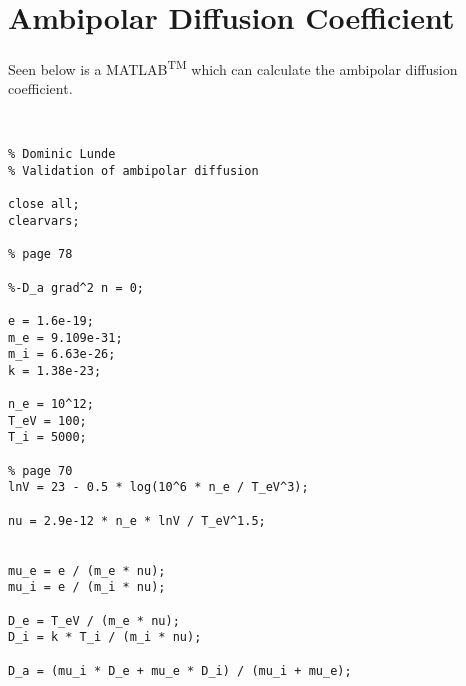 \chapter{Ambipolar Diffusion Coefficient}
\label{app:adc}
Seen below is a MATLAB\textsuperscript{TM} which can calculate the ambipolar diffusion coefficient. 

\begin{verbatim}


% Dominic Lunde
% Validation of ambipolar diffusion

close all;
clearvars;

% page 78

%-D_a grad^2 n = 0;

e = 1.6e-19;
m_e = 9.109e-31;
m_i = 6.63e-26;
k = 1.38e-23;

n_e = 10^12;
T_eV = 100;
T_i = 5000;

% page 70
lnV = 23 - 0.5 * log(10^6 * n_e / T_eV^3);

nu = 2.9e-12 * n_e * lnV / T_eV^1.5;


mu_e = e / (m_e * nu);
mu_i = e / (m_i * nu);

D_e = T_eV / (m_e * nu);
D_i = k * T_i / (m_i * nu);

D_a = (mu_i * D_e + mu_e * D_i) / (mu_i + mu_e);

\end{verbatim}
